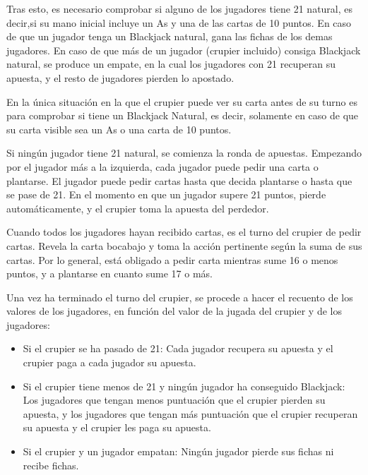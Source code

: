 Tras esto, es necesario comprobar si alguno de los jugadores tiene 21 natural, es decir,si su mano inicial incluye un As y una de las cartas de 10 puntos. En caso de que un jugador tenga un Blackjack natural, gana las fichas de los demas jugadores. En caso de que más de un jugador (crupier incluido) consiga Blackjack natural, se produce un empate, en la cual los jugadores con 21 recuperan su apuesta, y el resto de jugadores pierden lo apostado.

En la única situación en la que el crupier puede ver su carta antes de su turno es para comprobar si tiene un Blackjack Natural, es decir, solamente en caso de que su carta visible sea un As o una carta de 10 puntos.

Si ningún jugador tiene 21 natural, se comienza la ronda de apuestas. Empezando por el jugador más a la izquierda, cada jugador puede pedir una carta o plantarse. El jugador puede pedir cartas hasta que decida plantarse o hasta que se pase de 21. En el momento en que un jugador supere 21 puntos, pierde automáticamente, y el crupier toma la apuesta del perdedor. 

Cuando todos los jugadores hayan recibido cartas, es el turno del crupier de pedir cartas. Revela la carta bocabajo y toma la acción pertinente según la suma de sus cartas. Por lo general, está obligado a pedir carta mientras sume 16 o menos puntos, y a plantarse en cuanto sume 17 o más.

Una vez ha terminado el turno del crupier, se procede a hacer el recuento de los valores de los jugadores, en función del valor de la jugada del crupier y de los jugadores:
\begin{itemize}
\item Si el crupier se ha pasado de 21: Cada jugador recupera su apuesta y el crupier paga a cada jugador su apuesta.
\item Si el crupier tiene menos de 21 y ningún jugador ha conseguido Blackjack: Los jugadores que tengan menos puntuación que el crupier pierden su apuesta, y los jugadores que tengan más puntuación que el crupier recuperan su apuesta y el crupier les paga su apuesta.
\item Si el crupier y un jugador empatan: Ningún jugador pierde sus fichas ni recibe fichas.
\end{itemize} 


